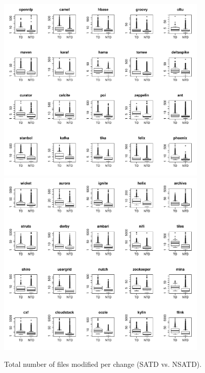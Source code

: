 \begin{figure}[tb]
	\centering
	\includegraphics[width=100mm]{figures/chapter4/rq3_td_nf_logged_1}
	\includegraphics[width=100mm]{figures/chapter4/rq3_td_nf_logged_2}
	\caption{Total number of files modified per change (SATD vs. NSATD).}
	\label{figure:total_files_td_vs_ntd}
\end{figure}


